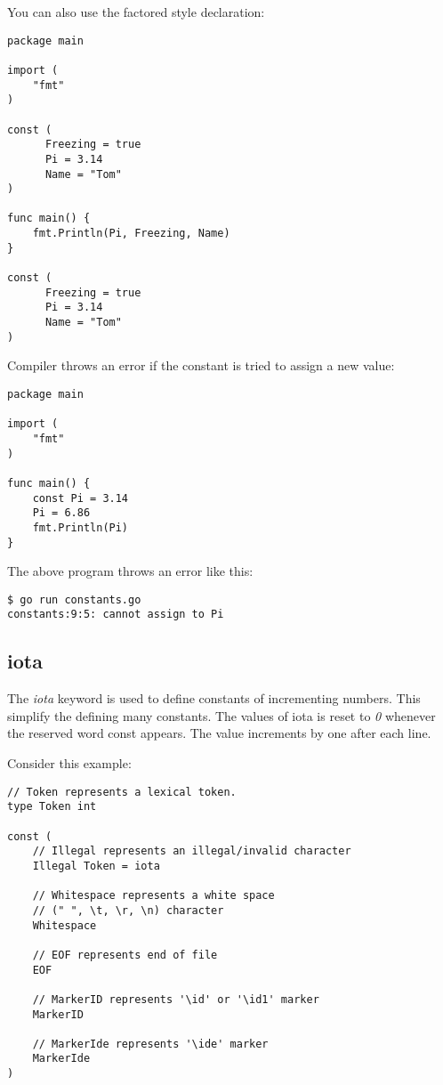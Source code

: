 You can also use the factored style declaration:

\begin{lstlisting}[numbers=none]
package main

import (
    "fmt"
)

const (
      Freezing = true
      Pi = 3.14
      Name = "Tom"
)

func main() {
    fmt.Println(Pi, Freezing, Name)
}

const (
      Freezing = true
      Pi = 3.14
      Name = "Tom"
)
\end{lstlisting}

Compiler throws an error if the constant is tried to assign a new
value:

\begin{lstlisting}[numbers=none]
package main

import (
    "fmt"
)

func main() {
    const Pi = 3.14
    Pi = 6.86
    fmt.Println(Pi)
}
\end{lstlisting}

The above program throws an error like this:

\begin{lstlisting}[numbers=none]
$ go run constants.go
constants:9:5: cannot assign to Pi
\end{lstlisting}

\subsection{iota}

The \textit{iota} keyword is used to define constants of incrementing
numbers.  This simplify the defining many constants.  The values of
iota is reset to \textit{0} whenever the reserved word const appears.
The value increments by one after each line.

Consider this example:

\begin{lstlisting}[numbers=none]
// Token represents a lexical token.
type Token int

const (
    // Illegal represents an illegal/invalid character
    Illegal Token = iota

    // Whitespace represents a white space
    // (" ", \t, \r, \n) character
    Whitespace

    // EOF represents end of file
    EOF

    // MarkerID represents '\id' or '\id1' marker
    MarkerID

    // MarkerIde represents '\ide' marker
    MarkerIde
)
\end{lstlisting}


